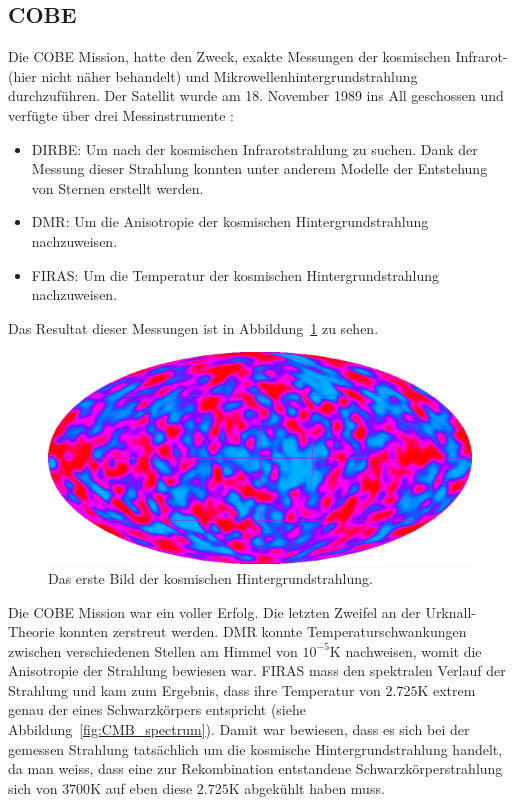 \subsection{\ac{COBE}}
Die \ac{COBE} Mission, hatte den Zweck, exakte 
Messungen der kosmischen Infrarot-(hier nicht näher behandelt) und 
Mikrowellenhintergrundstrahlung durchzuführen.
Der Satellit wurde am 18. November 1989 ins All geschossen und verfügte über 
drei Messinstrumente \cite{cmb:COBE}:
\begin{itemize}
	\item \ac{DIRBE}: Um nach der 
	kosmischen Infrarotstrahlung zu suchen.
	Dank der Messung dieser Strahlung konnten unter anderem Modelle der 
	Entstehung von Sternen erstellt werden.
	\item \ac{DMR}: Um die Anisotropie der 
	kosmischen Hintergrundstrahlung nachzuweisen.
	\item \ac{FIRAS}: Um die Temperatur 
	der kosmischen Hintergrundstrahlung nachzuweisen. 
\end{itemize}

Das Resultat dieser Messungen ist in Abbildung~\ref{fig:COBE} zu sehen.
\begin{figure}
	\centering
	\includegraphics[width=\linewidth]{cmb/images/CMB_COBE.png}
	\caption{Das erste Bild der kosmischen Hintergrundstrahlung.}
	\label{fig:COBE}
\end{figure}
Die \ac{COBE} Mission war ein voller Erfolg.
Die letzten Zweifel an der Urknall-Theorie konnten zerstreut werden.
\ac{DMR} konnte Temperaturschwankungen zwischen verschiedenen Stellen am Himmel 
von $10^{-5} \text{K}$ nachweisen, womit die Anisotropie der Strahlung bewiesen 
war.
\ac{FIRAS} mass den spektralen Verlauf der Strahlung und kam zum Ergebnis, dass 
ihre Temperatur von $2.725 \text{K}$ extrem genau der eines Schwarzkörpers 
entspricht (siehe Abbildung~\ref{fig:CMB_spectrum}).
Damit war bewiesen, dass es sich bei der gemessen Strahlung tatsächlich um die 
kosmische Hintergrundstrahlung handelt, da man weiss, dass eine zur 
Rekombination entstandene Schwarzkörperstrahlung sich von $3700 \text{K}$ auf 
eben diese $2.725 \text{K}$ abgekühlt haben muss.

